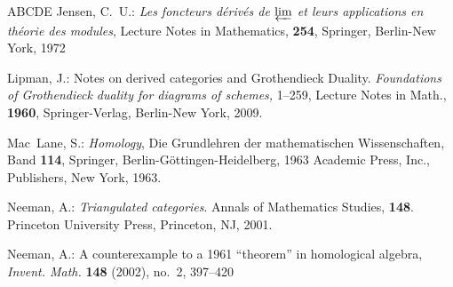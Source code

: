 \documentclass[reqno,11pt]{amsart}
\theoremstyle{plain}
\theoremstyle{remark}
\theoremstyle{definition}
\numberwithin{equation}{thm}
\begin{document}
\begin{thebibliography}{ABCDE}
 Jensen, C.~U.: {\it Les foncteurs d\'eriv\'es de $\varprojlim$ et leurs applications en th\'eorie des modules}, Lecture Notes in Mathematics, \textbf{254}, Springer, Berlin-New York, 1972
		
		
		
		
		
 Lipman, J.: Notes on derived categories and Grothendieck Duality. \textit{Foundations of Grothendieck duality for diagrams of schemes,} 1--259, Lecture Notes in Math., {\bf 1960}, Springer-Verlag, Berlin-New York, 2009.
		
		
  Mac~Lane, S.: {\it Homology}, Die Grundlehren der mathematischen Wissenschaften, Band \textbf{114}, Springer, Berlin-G\"ottingen-Heidelberg, 1963 Academic Press, Inc., Publishers, New York, 1963.
		
		
		
		
		
 Neeman, A.: \textit{Triangulated categories}. Annals of Mathematics Studies, \textbf{148}. Princeton University Press, Princeton, NJ, 2001.
		
 Neeman, A.: A counterexample to a 1961 ``theorem'' in homological algebra, \textit{Invent. Math.} {\bf 148} (2002), no.~2, 397--420
		
		
		

\end{thebibliography}
\end{document}
